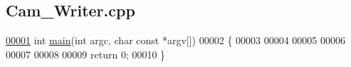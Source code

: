 \hypertarget{Cam__Writer_8cpp_source}{}\subsection{Cam\+\_\+\+Writer.\+cpp}
\label{Cam__Writer_8cpp_source}

\begin{DoxyCode}
\hypertarget{Cam__Writer_8cpp_source.tex_l00001}{}\hyperlink{Cam__Writer_8cpp_abf9e6b7e6f15df4b525a2e7705ba3089}{00001} \textcolor{keywordtype}{int} \hyperlink{Cam__Writer_8cpp_abf9e6b7e6f15df4b525a2e7705ba3089}{main}(\textcolor{keywordtype}{int} argc, \textcolor{keywordtype}{char} \textcolor{keyword}{const} *argv[])
00002 \{
00003     
00004     
00005 
00006     
00007 
00008 
00009     \textcolor{keywordflow}{return} 0;
00010 \}
\end{DoxyCode}
